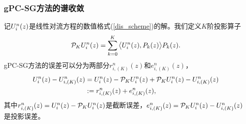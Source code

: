 \subsubsection{gPC-SG方法的谱收敛}
记$U^n_i(z)$是线性对流方程的数值格式(\ref{dis_scheme})的解。我们定义$K$阶投影算子
\begin{equation}
  \mathcal{P}_K U^n_i(z) = \sum_{k=0}^K \big\langle U^n_i(z), P_k(z) \big\rangle P_k(z).
\end{equation}
gPC-SG方法的误差可以分为两部分$r^n_{i,(K)}(z)$和$e^n_{i,(K)}(z)$，
\begin{equation}
  \begin{split}
    U^n_i(z) - U^n_{i,(K)}(z) & = U^n_i(z) - \mathcal{P}_K U^n_i(z) + \mathcal{P}_K U^n_i(z) - U^n_{i,(K)}(z)\\
    & := r^n_{i,(K)}(z) + e^n_{i,(K)}(z),
  \end{split}
\end{equation}
其中$r^n_{i,(K)}(z) = U^n_i(z) - \mathcal{P}_K U^n_i(z)$是截断误差，$e^n_{i,(K)}(z)=\mathcal{P}_K U^n_i(z) - U^n_{i,(K)}(z)$是投影误差。

